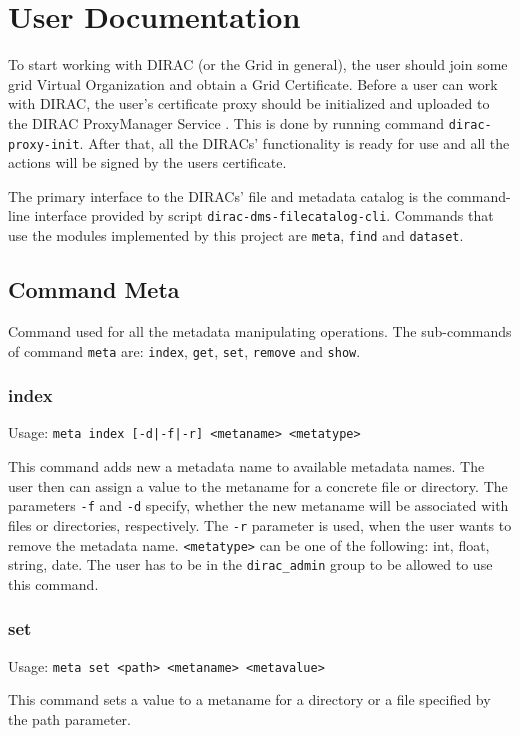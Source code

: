 \chapter{User Documentation}
\label{chap:user}

To start working with DIRAC 
(or the Grid in general), the user should join some 
grid Virtual Organization and obtain a Grid Certificate. 
Before a user can work with DIRAC, the user’s certificate proxy 
should be initialized and uploaded to the DIRAC ProxyManager Service \cite{DISET}.
This is done by running command \texttt{dirac-proxy-init}. After that,
all the DIRACs' functionality is ready for use and all the actions will
be signed by the users certificate.

The primary interface to the DIRACs' file and metadata catalog
is the command-line interface provided by script
\texttt{dirac-dms-filecatalog-cli}. Commands that use the modules 
implemented by this project are \texttt{meta}, \texttt{find} 
and \texttt{dataset}.

\section{Command Meta}
Command used for all the metadata manipulating operations.
The sub-commands of command \texttt{meta} are: \texttt{index}, \texttt{get},
\texttt{set}, \texttt{remove} and \texttt{show}.

\subsection{index}
Usage: \texttt{meta index [-d|-f|-r] <metaname> <metatype>}

This command adds new a metadata name to available metadata names.
The user then can assign a value to the metaname for a concrete file
or directory. The parameters \texttt{-f} and \texttt{-d} specify,
whether the new metaname will be associated with files or directories,
respectively. The \texttt{-r} parameter is used, when the user
wants to remove the metadata name. \texttt{<metatype>} can be
one of the following: int, float, string, date. The user has to be
in the \texttt{dirac\_admin} group to be allowed to use this
command.

\subsection{set}
Usage: \texttt{meta set <path> <metaname> <metavalue>}

This command  sets a value to a metaname for a directory or a file specified by
the path parameter. 

